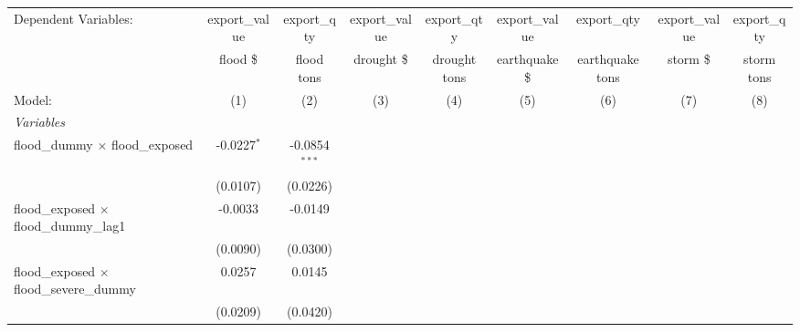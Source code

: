 
\begingroup
\centering
\begin{tabular}{lcccccccc}
   \tabularnewline \midrule \midrule
   Dependent Variables:                                              & export\_value         & export\_qty           & export\_value         & export\_qty           & export\_value         & export\_qty           & export\_value         & export\_qty\\   
                                                                     & flood \$              & flood tons            & drought \$            & drought tons          & earthquake \$         & earthquake tons       & storm \$              & storm tons  \\   
   Model:                                                            & (1)                   & (2)                   & (3)                   & (4)                   & (5)                   & (6)                   & (7)                   & (8)\\  
   \midrule
   \emph{Variables}\\
   flood\_dummy $\times$ flood\_exposed                              & -0.0227$^{*}$         & -0.0854$^{***}$       &                       &                       &                       &                       &                       &   \\   
                                                                     & (0.0107)              & (0.0226)              &                       &                       &                       &                       &                       &   \\   
   flood\_exposed $\times$ flood\_dummy\_lag1                        & -0.0033               & -0.0149               &                       &                       &                       &                       &                       &   \\   
                                                                     & (0.0090)              & (0.0300)              &                       &                       &                       &                       &                       &   \\   
   flood\_exposed $\times$ flood\_severe\_dummy                      & 0.0257                & 0.0145                &                       &                       &                       &                       &                       &   \\   
                                                                     & (0.0209)              & (0.0420)              &                       &                       &                       &                       &                       &   \\   

\end{tabular}
